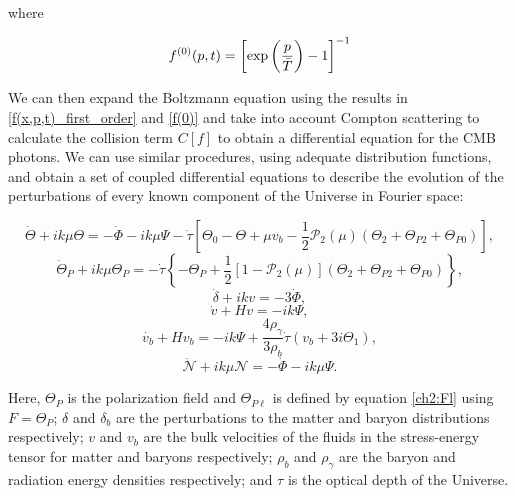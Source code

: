 \documentclass[openany,a4paper,12pt,oneside]{book}
\begin{document}
\begin{spacing}{1.5}
\noindent where

\begin{equation}\label{f(0)}
    f^{(0)}(p,t)=\left[\text{exp}\left(\frac{p}{\Bar{T}}\right)-1\right]^{-1}
\end{equation}

We can then expand the Boltzmann equation using the results in \eqref{f(x,p,t)_first_order} and \eqref{f(0)} and take into account Compton scattering to calculate the collision term $C[f]$ to obtain a differential equation for the CMB photons. We can use similar procedures, using adequate distribution functions, and obtain a set of coupled differential equations to describe the evolution of the perturbations of every known component of the Universe in Fourier space\cite{dodelson2020modern}:

\begin{equation}\label{diff_eq_radiation_perturbs}
    \dot{\Theta}+ik\mu\Theta=-\dot{\Phi}-ik\mu\Psi-\dot{\tau}\left[\Theta_0-\Theta+\mu v_b-\frac{1}{2}\mathcal{P}_2(\mu)(\Theta_2+\Theta_{P2}+\Theta_{P0})\right],
\end{equation}
\begin{equation}
    \dot{\Theta}_P+ik\mu\Theta_P=-\dot{\tau}\left\{-\Theta_P+\frac{1}{2}[1-\mathcal{P}_2(\mu)](\Theta_2+\Theta_{P2}+\Theta_{P0})\right\},
\end{equation}
\begin{equation}
    \dot{\delta}+ikv=-3\dot{\Phi},
\end{equation}
\begin{equation}
    \dot{v}+Hv=-ik\Psi,
\end{equation}
\begin{equation}
    \dot{v_b}+Hv_b=-ik\Psi+\frac{4\rho_\gamma}{3\rho_b}\dot{\tau}(v_b+3i\Theta_1),
\end{equation}
\begin{equation}\label{diff_eqs:neutrino_perturbations}
    \dot{\mathcal{N}}+ik\mu\mathcal{N}=-\dot{\Phi}-ik\mu\Psi.
\end{equation}

Here, $\Theta_P$ is the polarization field and $\Theta_{P\ell}$ is defined by equation \eqref{ch2:Fl} using $F=\Theta_P$; $\delta$ and $\delta_b$ are the perturbations to the matter and baryon distributions respectively; $v$ and $v_b$ are the bulk velocities of the fluids in the stress-energy tensor for matter and baryons respectively; $\rho_b$ and $\rho_\gamma$ are the baryon and radiation energy densities respectively; and $\tau$ is the optical depth of the Universe.


\end{spacing}
\end{document}
